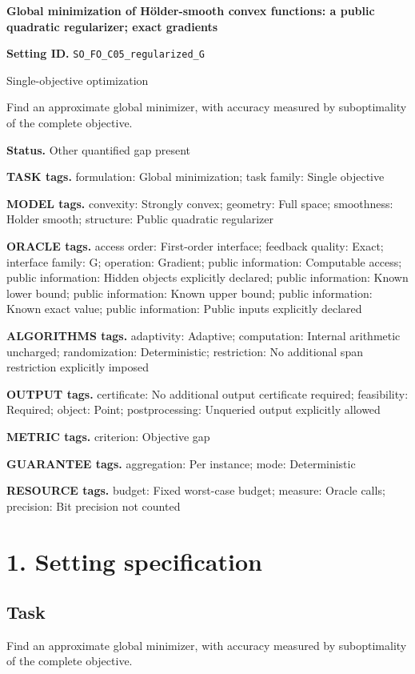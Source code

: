 \documentclass[10pt,a4paper]{article}
\begin{document}
\raggedright

{\LARGE\bfseries\sffamily\color{AtlasNavy} Global minimization of Hölder-smooth convex functions: a public quadratic regularizer; exact gradients\par}\vspace{5pt}
\textbf{Setting ID.} \texttt{SO\_\allowbreak{}FO\_\allowbreak{}C05\_\allowbreak{}regularized\_\allowbreak{}G}

Single-objective optimization

Find an approximate global minimizer, with accuracy measured by suboptimality of the complete objective.

\textbf{Status.} Other quantified gap present

\textbf{TASK tags.} formulation: Global minimization; task family: Single objective

\textbf{MODEL tags.} convexity: Strongly convex; geometry: Full space; smoothness: Holder smooth; structure: Public quadratic regularizer

\textbf{ORACLE tags.} access order: First-order interface; feedback quality: Exact; interface family: G; operation: Gradient; public information: Computable access; public information: Hidden objects explicitly declared; public information: Known lower bound; public information: Known upper bound; public information: Known exact value; public information: Public inputs explicitly declared

\textbf{ALGORITHMS tags.} adaptivity: Adaptive; computation: Internal arithmetic uncharged; randomization: Deterministic; restriction: No additional span restriction explicitly imposed

\textbf{OUTPUT tags.} certificate: No additional output certificate required; feasibility: Required; object: Point; postprocessing: Unqueried output explicitly allowed

\textbf{METRIC tags.} criterion: Objective gap

\textbf{GUARANTEE tags.} aggregation: Per instance; mode: Deterministic

\textbf{RESOURCE tags.} budget: Fixed worst-case budget; measure: Oracle calls; precision: Bit precision not counted

\section{1. Setting specification}
\subsection{Task}
Find an approximate global minimizer, with accuracy measured by suboptimality of the complete objective.
\end{document}
